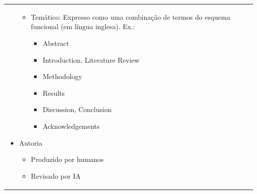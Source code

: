 \begin{longtable}[c]{ |p{8cm}|p{8cm}|p{8cm}| }
\begin{itemize}
\begin{itemize}
\begin{itemize}
            \end{itemize}
            \item Temático: Expresso como uma combinação de termos do esquema funcional (em língua inglesa). Ex.:
            \begin{itemize}
                \item Abstract
                \item Introduction, Literature Review
                \item Methodology
                \item Results
                \item Discussion, Conclusion
                \item Acknowledgements
            \end{itemize}
        \end{itemize}
        \item Autoria
        \begin{itemize}
            \item Produzido por humanos
            \item Revisado por IA
        \end{itemize}
    \end{itemize}


\end{longtable}
